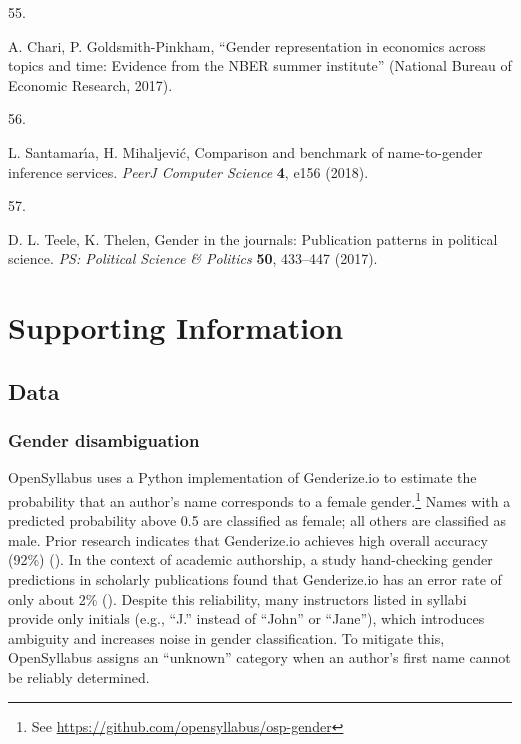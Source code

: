\documentclass[
  british,
  12pt,
]{article}
\newlength{\cslhangindent}
\newlength{\csllabelwidth}
\newenvironment{CSLReferences}[2] %
 {\begin{list}{}{%
  \setlength{\itemindent}{0pt}
  \setlength{\leftmargin}{0pt}
  \setlength{\parsep}{0pt}
  \ifodd #1
   \setlength{\leftmargin}{\cslhangindent}
   \setlength{\itemindent}{-1\cslhangindent}
  \fi
  \setlength{\itemsep}{#2\baselineskip}}}
 {\end{list}}
\newcommand{\CSLLeftMargin}[1]{\parbox[t]{\csllabelwidth}{\strut#1\strut}}
\newcommand{\CSLRightInline}[1]{\parbox[t]{\linewidth - \csllabelwidth}{\strut#1\strut}}
\begin{document}
\begin{CSLReferences}{0}{1}
\CSLLeftMargin{55. }%
\CSLRightInline{A. Chari, P. Goldsmith-Pinkham, {``Gender representation in economics across topics and time: Evidence from the NBER summer institute''} (National Bureau of Economic Research, 2017).}

\CSLLeftMargin{56. }%
\CSLRightInline{L. Santamarı́a, H. Mihaljević, Comparison and benchmark of name-to-gender inference services. \emph{PeerJ Computer Science} \textbf{4}, e156 (2018).}

\CSLLeftMargin{57. }%
\CSLRightInline{D. L. Teele, K. Thelen, Gender in the journals: Publication patterns in political science. \emph{PS: Political Science \& Politics} \textbf{50}, 433--447 (2017).}

\end{CSLReferences}

\newpage
\appendix
\renewcommand{\thefigure}{SI-\arabic{figure}}
\renewcommand{\thesection}{SI}
\renewcommand{\thesubsection}{SI-\arabic{subsection}}

\setcounter{figure}{0}
\setcounter{table}{0}
\setcounter{section}{0}
\setcounter{subsection}{0}
\renewcommand{\thetable}{SI-\arabic{table}}

\section{Supporting Information}\label{supporting-information}

\subsection{Data}\label{data}

\subsubsection{Gender disambiguation}\label{gender-disambiguation}

OpenSyllabus uses a Python implementation of Genderize.io to estimate the probability that an author's name corresponds to a female gender.\footnote{See \url{https://github.com/opensyllabus/osp-gender}} Names with a predicted probability above 0.5 are classified as female; all others are classified as male. Prior research indicates that Genderize.io achieves high overall accuracy (92\%) (). In the context of academic authorship, a study hand-checking gender predictions in scholarly publications found that Genderize.io has an error rate of only about 2\% (). Despite this reliability, many instructors listed in syllabi provide only initials (e.g., ``J.'' instead of ``John'' or ``Jane''), which introduces ambiguity and increases noise in gender classification. To mitigate this, OpenSyllabus assigns an ``unknown'' category when an author's first name cannot be reliably determined.
\end{document}
